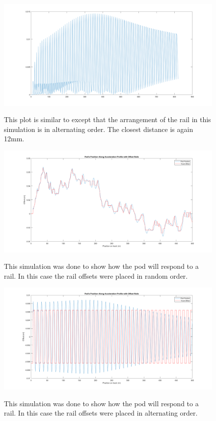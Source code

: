 \documentclass[main.tex]{subfiles}
\begin{document}
    \begin{figure}[H]
        	\centering
        \includegraphics[width=\linewidth]{images/OscillatingMaxDistToRail}
        \label{fig:OMaxDistRail}
        \caption{This plot is similar to  except that the arrangement of the rail in this simulation is in alternating order. The closest distance is again 12mm.}
    \end{figure}
    
    
    \begin{figure}[H]
    	\centering
        \includegraphics[width=\linewidth]{images/RandPodLateralResponse}
        \label{fig:RandpodLateralResponse}
        \caption{This simulation was done to show how the pod will respond to a rail. In this case the rail offsets were placed in random order.}
    \end{figure}
    \begin{figure}[H]
    	\centering
        \includegraphics[width=\linewidth]{images/OscillatingPodLateralResponse}
        \label{fig:OPodLateralRespnse}
        \caption{This simulation was done to show how the pod will respond to a rail. In this case the rail offsets were placed in alternating order.}
    \end{figure}    
    
\end{document}
